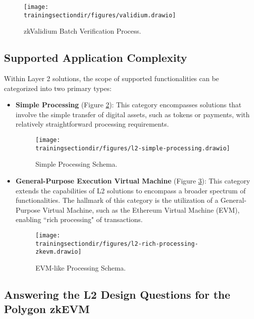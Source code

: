 \begin{figure}[h!]
\centering
\texttt{[image: \\trainingsectiondir/figures/validium.drawio]}
\caption{zkValidium Batch Verification Process.}
\label{fig:validium-process}
\end{figure}



\subsection{Supported Application Complexity}

Within Layer 2 solutions, the scope of supported functionalities can be categorized into two primary types:

\begin{itemize}

\item \textbf{Simple Processing} (Figure \ref{fig:simple-processing}): This category encompasses solutions that involve the simple transfer of digital assets, such as tokens or payments, with relatively straightforward processing requirements.

\begin{figure}[h!]
\centering
\texttt{[image: \\trainingsectiondir/figures/l2-simple-processing.drawio]}
\caption{Simple Processing Schema.}
\label{fig:simple-processing}
\end{figure}

\item \textbf{General-Purpose Execution Virtual Machine} (Figure \ref{fig:rich-processing}): This category extends the capabilities of L2 solutions to encompass a broader spectrum of functionalities. The hallmark of this category is the utilization of a General-Purpose Virtual Machine, such as the Ethereum Virtual Machine (EVM), enabling ``rich processing" of transactions.

\begin{figure}[h!]
\centering
\texttt{[image: \\trainingsectiondir/figures/l2-rich-processing-zkevm.drawio]}
\caption{EVM-like Processing Schema.}
\label{fig:rich-processing}
\end{figure}

\end{itemize}


\subsection{Answering the L2 Design Questions for the Polygon zkEVM}

